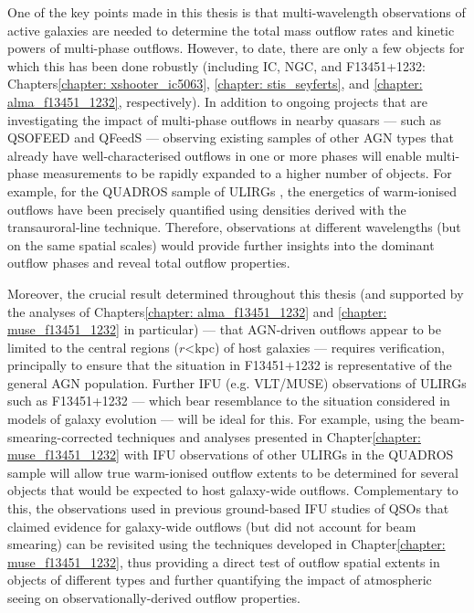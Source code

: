 One of the key points made in this thesis is that multi-wavelength observations of active galaxies are needed to determine the total mass outflow rates and kinetic powers of multi-phase outflows. However, to date, there are only a few objects for which this has been done robustly (including IC, NGC, and F13451+1232: Chapters\;\ref{chapter: xshooter_ic5063}, \ref{chapter: stis_seyferts}, and \ref{chapter: alma_f13451_1232}, respectively). In addition to ongoing projects that are investigating the impact of multi-phase outflows in nearby quasars --- such as QSOFEED \citep{RamosAlmeida2022} and QFeedS \citep{Jarvis2019} ---  observing existing samples of other AGN types that already have well-characterised outflows in one or more phases will enable multi-phase measurements to be rapidly expanded to a higher number of objects. For example, for the QUADROS sample of ULIRGs \citep{Rose2018, Spence2018, Tadhunter2018, Tadhunter2019}, the energetics of warm-ionised outflows have been precisely quantified using densities derived with the transauroral-line technique. Therefore, observations at different wavelengths (but on the same spatial scales) would provide further insights into the dominant outflow phases and reveal total outflow properties.

Moreover, the crucial result determined throughout this thesis (and supported by the analyses of Chapters\;\ref{chapter: alma_f13451_1232} and \ref{chapter: muse_f13451_1232} in particular) --- that AGN-driven outflows appear to be limited to the central regions ($r$\;\textless{}\;kpc) of host galaxies --- requires verification, principally to ensure that the situation in F13451+1232 is representative of the general AGN population. Further IFU (e.g. VLT/MUSE) observations of ULIRGs such as F13451+1232 --- which bear resemblance to the situation considered in models of galaxy evolution --- will be ideal for this. For example, using the beam-smearing-corrected techniques and analyses presented in Chapter\;\ref{chapter: muse_f13451_1232} with IFU observations of other ULIRGs in the QUADROS sample will allow true warm-ionised outflow extents to be determined for several objects that would be expected to host galaxy-wide outflows. Complementary to this, the observations used in previous ground-based IFU studies of QSOs that claimed evidence for galaxy-wide outflows (but did not account for beam smearing) can be revisited using the techniques developed in Chapter\;\ref{chapter: muse_f13451_1232}, thus providing a direct test of outflow spatial extents in objects of different types and further quantifying the impact of atmospheric seeing on observationally-derived outflow properties.

